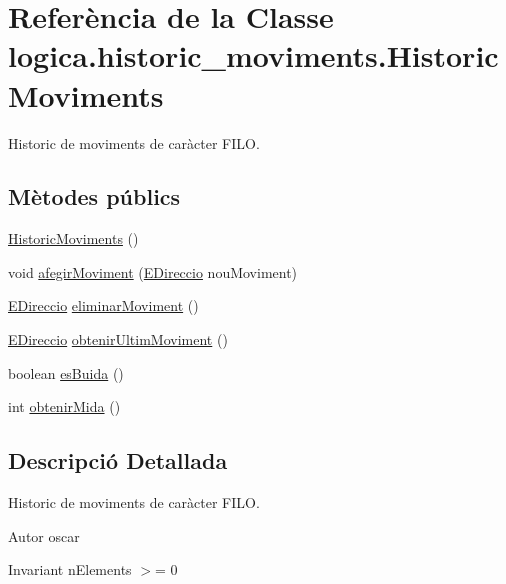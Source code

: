 \hypertarget{classlogica_1_1historic__moviments_1_1_historic_moviments}{\section{Referència de la Classe logica.\+historic\+\_\+moviments.\+Historic\+Moviments}
\label{classlogica_1_1historic__moviments_1_1_historic_moviments}
}


Historic de moviments de caràcter F\+I\+L\+O.  


\subsection*{Mètodes públics}
\begin{DoxyCompactItemize}
\item 
\hyperlink{classlogica_1_1historic__moviments_1_1_historic_moviments_a495dab908c92d96be0111a337aa64616}{Historic\+Moviments} ()
\item 
void \hyperlink{classlogica_1_1historic__moviments_1_1_historic_moviments_add8ce785d3feabe0489005024fa34c31}{afegir\+Moviment} (\hyperlink{enumlogica_1_1enumeracions_1_1_e_direccio}{E\+Direccio} nou\+Moviment)
\item 
\hyperlink{enumlogica_1_1enumeracions_1_1_e_direccio}{E\+Direccio} \hyperlink{classlogica_1_1historic__moviments_1_1_historic_moviments_af8ab1a5f7f30d6bf02567247f551a56d}{eliminar\+Moviment} ()
\item 
\hyperlink{enumlogica_1_1enumeracions_1_1_e_direccio}{E\+Direccio} \hyperlink{classlogica_1_1historic__moviments_1_1_historic_moviments_a38f0ad91020d373f59f3ca715d8348cd}{obtenir\+Ultim\+Moviment} ()
\item 
boolean \hyperlink{classlogica_1_1historic__moviments_1_1_historic_moviments_a6a28bbb1fb8d5d017b98ff6fae9cb684}{es\+Buida} ()
\item 
int \hyperlink{classlogica_1_1historic__moviments_1_1_historic_moviments_ae8749aa4dc16dc362b784796325dbc92}{obtenir\+Mida} ()
\end{DoxyCompactItemize}


\subsection{Descripció Detallada}
Historic de moviments de caràcter F\+I\+L\+O. 

\begin{DoxyAuthor}{Autor}
oscar 
\end{DoxyAuthor}
\begin{DoxyInvariant}{Invariant}
n\+Elements $>$= 0 
\end{DoxyInvariant}



